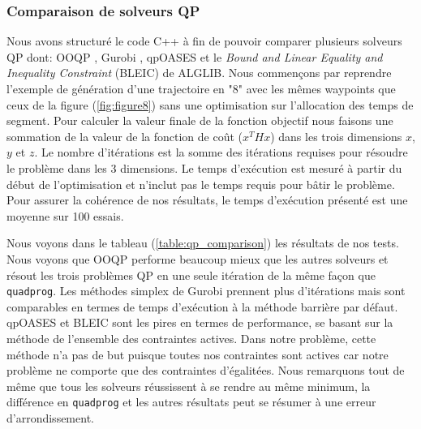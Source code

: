 \subsubsection{Comparaison de solveurs QP}

Nous avons structuré le code C++ à fin de pouvoir comparer plusieurs solveurs QP dont: OOQP \citep{ooqp}, Gurobi \citep{gurobi}, qpOASES \citep{Ferreau2014} et le \textit{Bound and Linear Equality and Inequality Constraint} (BLEIC) de ALGLIB\cite{alglib}. Nous commençons par reprendre l'exemple de génération d'une trajectoire en "8" avec les mêmes waypoints que ceux de la figure (\ref{fig:figure8}) sans une optimisation sur l'allocation des temps de segment. Pour calculer la valeur finale de la fonction objectif nous faisons une sommation de la valeur de la fonction de coût ($x^T H x$) dans les trois dimensions $x$, $y$ et $z$. Le nombre d'itérations est la somme des itérations requises pour résoudre le problème dans les 3 dimensions. Le temps d'exécution est mesuré à partir du début de l'optimisation et n'inclut pas le temps requis pour bâtir le problème. Pour assurer la cohérence de nos résultats, le temps d'exécution présenté est une moyenne sur 100 essais.

Nous voyons dans le tableau (\ref{table:qp_comparison}) les résultats de nos tests. Nous voyons que OOQP performe beaucoup mieux que les autres solveurs et résout les trois problèmes QP en une seule itération de la même façon que \texttt{quadprog}. Les méthodes simplex de Gurobi prennent plus d'itérations mais sont comparables en termes de temps d'exécution à la méthode barrière par défaut. qpOASES et BLEIC sont les pires en termes de performance, se basant sur la méthode de l'ensemble des contraintes actives. Dans notre problème, cette méthode n'a pas de but puisque toutes nos contraintes sont actives car notre problème ne comporte que des contraintes d'égalitées. Nous remarquons tout de même que tous les solveurs réussissent à se rendre au même minimum, la différence en \texttt{quadprog} et les autres résultats peut se résumer à une erreur d'arrondissement.

